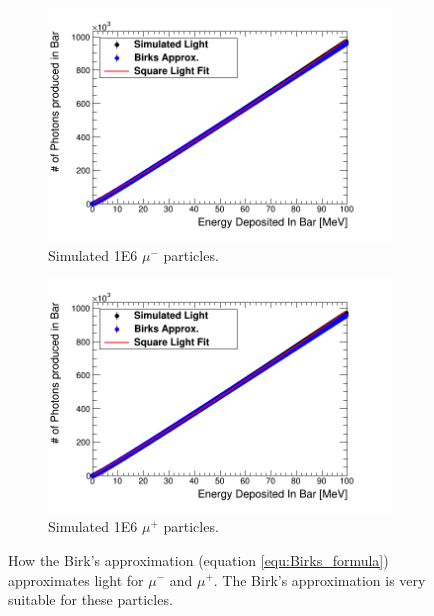 \begin{figure}[htbp]
\centering
\begin{subfigure}{.5\textwidth}
  \centering
  \includegraphics[width=\linewidth]{Appendix5/newFigs/mu-BirksSlab_simAndApproxLight.png}
  \captionsetup{width=.9\linewidth}
  \caption{Simulated 1E6 $\mu^-$ particles.}
  \label{subfig:append5_light_of_muons0-100mev}
\end{subfigure}%
\begin{subfigure}{.5\textwidth}
  \centering
  \includegraphics[width=\linewidth]{Appendix5/newFigs/mu+BirksSlab_simAndApproxLight.png}
  \captionsetup{width=.9\linewidth}
  \caption{Simulated 1E6 $\mu^+$ particles.}
  \label{subfig:append5_light_of_Amuons0-100mev}
\end{subfigure}
\caption{How the Birk's approximation (equation \ref{equ:Birks_formula}) approximates light for $\mu^-$ and $\mu^+$. The Birk's approximation is very suitable for these particles.}
\label{fig:append5_light_of_muons_Amuons0-100mev}
\end{figure}

